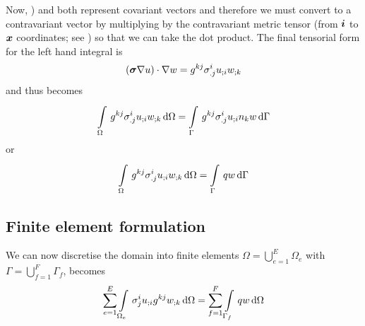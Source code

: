 Now, ) and 
both represent covariant vectors and therefore we must convert  to a contravariant vector by 
multiplying by the contravariant metric tensor (from $ \boldsymbol{i} $ to $ \boldsymbol{x} $ 
coordinates; see )
so that we can take the dot product. The final tensorial form for the left
hand integral is
\begin{equation}
  \dotprod{\pbrac{\conductivitytensor\gradient{}{u}}}{\gradient{}{w}} = 
  \generalmetrictensorsymbol^{kj}\conductivitytensorsymbol^{i}_{.j}\covarderiv{u}{i}\covarderiv{w}{k}
\end{equation}
and thus  becomes
\begin{equation}
  \gint{\Omega}{}{\generalmetrictensorsymbol^{kj}\conductivitytensorsymbol^{i}_{.j}\covarderiv{u}{i}\covarderiv{w}{k}}{\Omega}
  = \gint{\Gamma}{}{\generalmetrictensorsymbol^{kj}\conductivitytensorsymbol^{i}_{.j}\covarderiv{u}{i}n_{k}w}{\Gamma}
  \label{eqn:LaplaceWeightedResidualTensorForm1}
\end{equation}
or
\begin{equation}
  \gint{\Omega}{}{\generalmetrictensorsymbol^{kj}\conductivitytensorsymbol^{i}_{.j}\covarderiv{u}{i}\covarderiv{w}{k}}{\Omega}
  = \gint{\Gamma}{}{qw}{\Gamma}
  \label{eqn:LaplaceWeightedResidualTensorForm2}
\end{equation}

\subsection{Finite element formulation}

We can now discretise the domain into finite elements \ie $\Omega=
\displaystyle{\bigcup_{e=1}^{E}}\Omega_{e}$ with
$\Gamma=\displaystyle{\bigcup_{f=1}^{F}}\Gamma_{f}$, 
 becomes
\begin{equation}
  \dsum_{e=1}^{E}\gint{\Omega_{e}}{}{\conductivitytensorsymbol^{i}_{j}\covarderiv{u}{i}\generalmetrictensorsymbol^{kj}
    \covarderiv{w}{k}}{\Omega}
  =\dsum_{f=1}^{F}\gint{\Gamma_{f}}{}{qw}{\Omega}
\end{equation}

